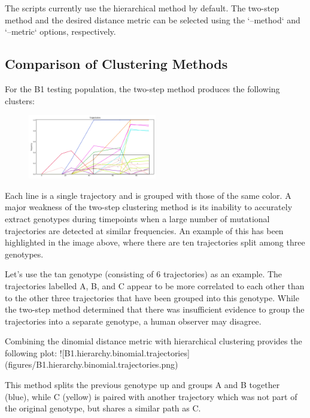 \documentclass{report}
\begin{document}
The scripts currently use the hierarchical method by default.
The two-step method and the desired distance metric can be selected using the `--method` and `--metric` options, respectively.

\subsection{Comparison of Clustering Methods}

For the B1 testing population, the two-step method produces the following clusters:
\begin{figure}
\includegraphics[width=0.5\textwidth]{B1_twostep_trajectories}
\end{figure}
Each line is a single trajectory and is grouped with those of the same color. A major weakness of the two-step clustering method is its inability to accurately extract genotypes during timepoints when a large number of mutational trajectories are detected at similar frequencies. An example of this has been highlighted in the image above, where there are ten trajectories split among three genotypes.

Let's use the tan genotype (consisting of 6 trajectories) as an example. The trajectories labelled A, B, and C appear to be more correlated to each other than to the other three trajectories that have been grouped into this genotype. While the two-step method determined that there was insufficient evidence to group the trajectories into a separate genotype, a human observer may disagree.

Combining the dinomial distance metric with hierarchical clustering provides the following plot:
![B1.hierarchy.binomial.trajectories](figures/B1.hierarchy.binomial.trajectories.png)

This method splits the previous genotype up and groups A and B together (blue), while C (yellow) is paired with another trajectory which was not part of the original genotype, but shares a similar path as C.
\end{document}
